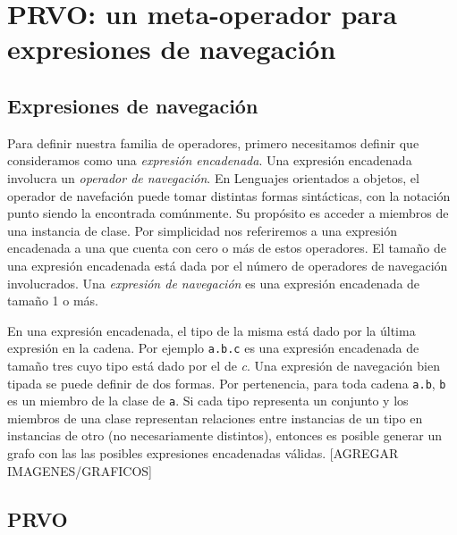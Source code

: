 \chapter[PRVO]{PRVO: un meta-operador para expresiones de navegaci\'on}
\label{sec:prvo}

\section{Expresiones de navegaci\'on}
\label{sec:prvo.navigationalExpressions}

Para definir nuestra familia de operadores, primero necesitamos definir que consideramos como una \emph{expresi\'on encadenada}. Una expresi\'on encadenada involucra un \emph{operador de navegaci\'on}. En Lenguajes orientados a objetos, el operador de navefaci\'on puede tomar distintas formas sint\'acticas, con la notaci\'on punto siendo la encontrada com\'unmente. Su prop\'osito es acceder a miembros de una instancia de clase. Por simplicidad nos referiremos a una expresi\'on encadenada a una que cuenta con cero o m\'as de estos operadores. El tama\~no de una expresi\'on encadenada est\'a dada por el n\'umero de operadores de navegaci\'on involucrados. Una \emph{expresi\'on de navegaci\'on} es una expresi\'on encadenada de tama\~no 1 o m\'as.

En una expresi\'on encadenada, el tipo de la misma est\'a dado por la \'ultima expresi\'on en la cadena. Por ejemplo \lstinline|a.b.c| es una expresi\'on encadenada de tama\~no tres cuyo tipo est\'a dado por el de \emph{c}. Una expresi\'on de navegaci\'on bien tipada se puede definir de dos formas. Por pertenencia, para toda cadena \texttt{a.b}, \texttt{b} es un miembro de la clase de \texttt{a}. Si cada tipo representa un conjunto y los miembros de una clase representan relaciones entre instancias de un tipo en instancias de otro (no necesariamente distintos), entonces es posible generar un grafo con las las posibles expresiones encadenadas v\'alidas.
[AGREGAR IMAGENES/GRAFICOS]

\section{PRVO}
\label{sec:prvo.prvo}


